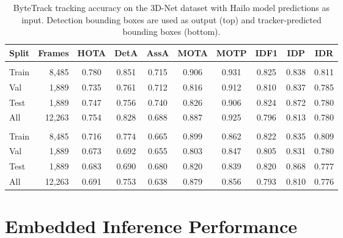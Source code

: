 \documentclass[12pt,oneside,bibtotoc,liststotoc]{scrbook}
\begin{document}
\begin{table}[H]
    \centering
    \scriptsize
    \begin{tabular}{|l r cccccccc|}
        \toprule
        \rowcolor{white}
        Split & Frames   & HOTA  & DetA  & AssA  & MOTA  & MOTP  & IDF1  & IDP   & IDR   \\
        \midrule
        \rowcolor{white}
        \multicolumn{10}{|l|}{\textit{Detection bounding boxes as output}}                 \\
        \midrule
        Train & 8{,}485  & 0.780 & 0.851 & 0.715 & 0.906 & 0.931 & 0.825 & 0.838 & 0.811 \\
        Val   & 1{,}889  & 0.735 & 0.761 & 0.712 & 0.816 & 0.912 & 0.810 & 0.837 & 0.785 \\
        Test  & 1{,}889  & 0.747 & 0.756 & 0.740 & 0.826 & 0.906 & 0.824 & 0.872 & 0.780 \\
        All   & 12{,}263 & 0.754 & 0.828 & 0.688 & 0.887 & 0.925 & 0.796 & 0.813 & 0.780 \\
        \midrule
        \rowcolor{white}
        \multicolumn{10}{|l|}{\textit{Tracker-predicted bounding boxes as output}}         \\
        \midrule
        Train & 8{,}485  & 0.716 & 0.774 & 0.665 & 0.899 & 0.862 & 0.822 & 0.835 & 0.809 \\
        Val   & 1{,}889  & 0.673 & 0.692 & 0.655 & 0.803 & 0.847 & 0.805 & 0.831 & 0.780 \\
        Test  & 1{,}889  & 0.683 & 0.690 & 0.680 & 0.820 & 0.839 & 0.820 & 0.868 & 0.777 \\
        All   & 12{,}263 & 0.691 & 0.753 & 0.638 & 0.879 & 0.856 & 0.793 & 0.810 & 0.776 \\
        \bottomrule
    \end{tabular}
    \caption{
        ByteTrack tracking accuracy on the 3D-Net dataset with Hailo model predictions as
        input. Detection bounding boxes are used as output (top) and tracker-predicted
        bounding boxes (bottom).
    }
    \vspace{-3em}
    \label{tab:tracking_accuracy_splits}
\end{table}

\section{Embedded Inference Performance}
\vspace{-0.5em}
\end{document}

